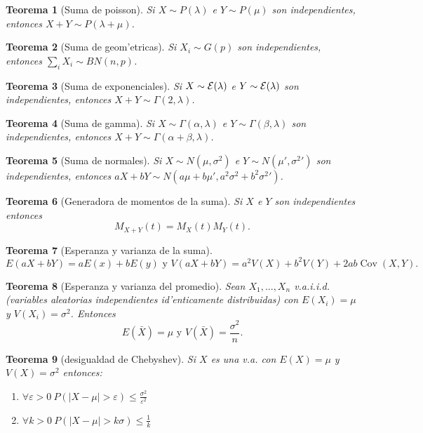 \documentclass[a4paper,spanish]{article}
\newcommand{\eps}[0]{\varepsilon}
\DeclareMathOperator{\Cov}{Cov}
\newcommand{\expon}[0]{{\cal E}}
\newtheorem{teo}{Teorema}
\begin{document}
\begin{teo}[Suma de poisson]
Si $X \sim P(\lambda)$ e $Y \sim P(\mu)$ son independientes, entonces 
$X+Y \sim P(\lambda + \mu)$.
\end{teo}

\begin{teo}[Suma de geom'etricas]
Si $X_i \sim G(p)$ son independientes, entonces $\sum_i X_i \sim BN(n,p)$.
\end{teo}

\begin{teo}[Suma de exponenciales]
Si $X \sim \expon(\lambda)$ e $Y \sim \expon(\lambda)$ son independientes, 
entonces $X+Y \sim \Gamma(2, \lambda)$.
\end{teo}

\begin{teo}[Suma de gamma]
Si $X \sim \Gamma(\alpha, \lambda)$ e $Y \sim \Gamma(\beta, \lambda)$ son
independientes, entonces $X+Y \sim \Gamma(\alpha+\beta, \lambda)$.
\end{teo}

\begin{teo}[Suma de normales]
Si $X \sim N(\mu,\sigma^2)$ e $Y \sim N(\mu', {\sigma^2}')$ son independientes,
entonces $aX+bY \sim N(a\mu+b\mu', a^2\sigma^2+b^2{\sigma^2}')$.
\end{teo}

\begin{teo}[Generadora de momentos de la suma]
Si $X$ e $Y$ son independientes entonces $$M_{X+Y}(t) = M_X(t) M_Y(t).$$
\end{teo}

\begin{teo}[Esperanza y varianza de la suma]
$$E(aX+bY) = aE(x)+bE(y) \mbox{\ \ y\ \ } 
	V(aX+bY) = a^2V(X)+b^2V(Y)+2ab\Cov(X,Y).$$
\end{teo}

\begin{teo}[Esperanza y varianza del promedio]
Sean $X_1,...,X_n$ v.a.i.i.d. (variables aleatorias independientes 
id'enticamente distribuidas) con $E(X_i) = \mu$ y $V(X_i) = \sigma^2$. 
Entonces 
$$E(\bar{X}) = \mu \mbox{\ \ y\ \ } V(\bar{X}) = \frac{\sigma^2}{n}.$$
\end{teo}

\begin{teo}[desigualdad de Chebyshev]
Si $X$ es una v.a. con $E(X) = \mu$ y $V(X) = \sigma^2$ entonces:
\begin{enumerate}
\item $\forall \eps > 0\ P(|X - \mu| > \eps) \leq \frac{\sigma^2}{\eps^2}$
\item $\forall k > 0\ P(|X - \mu| > k\sigma) \leq \frac{1}{k}$
\end{enumerate}
\end{teo}
\end{document}
